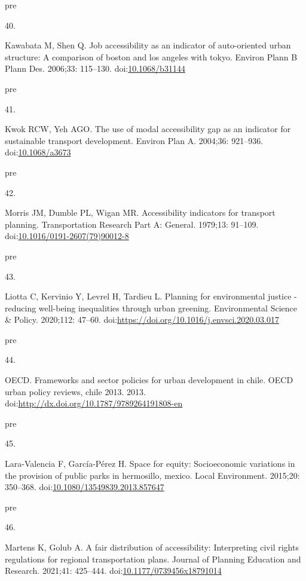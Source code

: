 \documentclass[10pt,letterpaper]{article}
\newlength{\cslhangindent}
\newlength{\csllabelwidth}
\newlength{\cslentryspacingunit} %
\newenvironment{CSLReferences}[2] %
 {%
  \setlength{\parindent}{0pt}
  \ifodd #1
  \let\oldpar\par
  \def\par{\hangindent=\cslhangindent\oldpar}
  \fi
  \setlength{\parskip}{#2\cslentryspacingunit}
 }%
 {}
\newcommand{\CSLLeftMargin}[1]{\parbox[t]{\csllabelwidth}{#1}}
\newcommand{\CSLRightInline}[1]{\parbox[t]{\linewidth - \csllabelwidth}{#1}\break}
\providecommand{\DIFaddtex}[1]{{\protect\color{blue}\uwave{#1}}} %
\providecommand{\DIFadd}[1]{\texorpdfstring{\DIFaddtex{#1}}{#1}} %
\begin{document}
\begin{CSLReferences}{0}{0}
\leavevmode\vadjust \DIFadd{pre}{\hypertarget{ref-kawabataJobAccessibilityIndicator2006}{}}%
\CSLLeftMargin{40. }%
\CSLRightInline{Kawabata M, Shen Q. Job accessibility as an indicator of
auto-oriented urban structure: A comparison of boston and los angeles
with tokyo. Environ Plann B Plann Des. 2006;33: 115--130.
doi:\href{https://doi.org/10.1068/b31144}{10.1068/b31144}}

\leavevmode\vadjust \DIFadd{pre}{\hypertarget{ref-kwokUseModalAccessibility2004}{}}%
\CSLLeftMargin{41. }%
\CSLRightInline{Kwok RCW, Yeh AGO. The use of modal accessibility gap as
an indicator for sustainable transport development. Environ Plan A.
2004;36: 921--936.
doi:\href{https://doi.org/10.1068/a3673}{10.1068/a3673}}

\leavevmode\vadjust \DIFadd{pre}{\hypertarget{ref-morrisAccessibilityIndicatorsTransport1979}{}}%
\CSLLeftMargin{42. }%
\CSLRightInline{Morris JM, Dumble PL, Wigan MR. Accessibility indicators
for transport planning. Transportation Research Part A: General.
1979;13: 91--109.
doi:\href{https://doi.org/10.1016/0191-2607(79)90012-8}{10.1016/0191-2607(79)90012-8}}

\leavevmode\vadjust \DIFadd{pre}{\hypertarget{ref-liottaPlanning2020}{}}%
\CSLLeftMargin{43. }%
\CSLRightInline{Liotta C, Kervinio Y, Levrel H, Tardieu L. Planning for
environmental justice - reducing well-being inequalities through urban
greening. Environmental Science \& Policy. 2020;112: 47--60.
doi:\url{https://doi.org/10.1016/j.envsci.2020.03.017}}

\leavevmode\vadjust \DIFadd{pre}{\hypertarget{ref-OECDFrameworks2013}{}}%
\CSLLeftMargin{44. }%
\CSLRightInline{OECD. Frameworks and sector policies for urban
development in chile. OECD urban policy reviews, chile 2013. 2013.
doi:\url{http://dx.doi.org/10.1787/9789264191808-en}}

\leavevmode\vadjust \DIFadd{pre}{\hypertarget{ref-laraSpace2015}{}}%
\CSLLeftMargin{45. }%
\CSLRightInline{Lara-Valencia F, García-Pérez H. Space for equity:
Socioeconomic variations in the provision of public parks in hermosillo,
mexico. Local Environment. 2015;20: 350--368.
doi:\href{https://doi.org/10.1080/13549839.2013.857647}{10.1080/13549839.2013.857647}}

\leavevmode\vadjust \DIFadd{pre}{\hypertarget{ref-martensFair2021}{}}%
\CSLLeftMargin{46. }%
\CSLRightInline{Martens K, Golub A. A fair distribution of
accessibility: Interpreting civil rights regulations for regional
transportation plans. Journal of Planning Education and Research.
2021;41: 425--444.
doi:\href{https://doi.org/10.1177/0739456x18791014}{10.1177/0739456x18791014}}


\end{CSLReferences}
\end{document}
